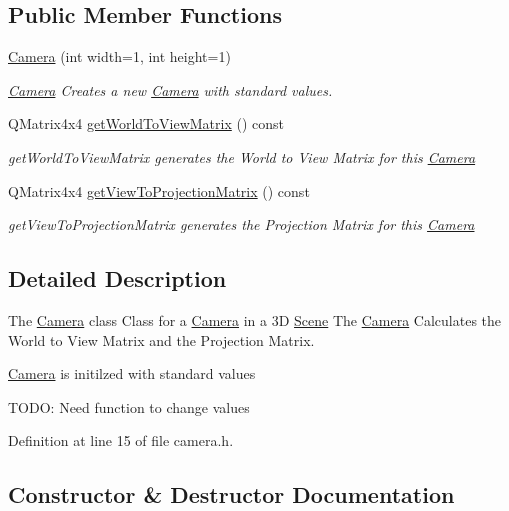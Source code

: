 \subsection*{Public Member Functions}
\begin{DoxyCompactItemize}
\item 
\hyperlink{class_camera_a3ac5bf011721a2b688e5ce077e4ee2e8}{Camera} (int width=1, int height=1)
\begin{DoxyCompactList}\small\item\em \hyperlink{class_camera}{Camera} Creates a new \hyperlink{class_camera}{Camera} with standard values. \end{DoxyCompactList}\item 
Q\+Matrix4x4 \hyperlink{class_camera_a1dd0e418636627fca41d061ef82d869d}{get\+World\+To\+View\+Matrix} () const 
\begin{DoxyCompactList}\small\item\em get\+World\+To\+View\+Matrix generates the World to View Matrix for this \hyperlink{class_camera}{Camera} \end{DoxyCompactList}\item 
Q\+Matrix4x4 \hyperlink{class_camera_aebc04996f3f393bdf98a8034d8f10a03}{get\+View\+To\+Projection\+Matrix} () const 
\begin{DoxyCompactList}\small\item\em get\+View\+To\+Projection\+Matrix generates the Projection Matrix for this \hyperlink{class_camera}{Camera} \end{DoxyCompactList}\end{DoxyCompactItemize}


\subsection{Detailed Description}
The \hyperlink{class_camera}{Camera} class Class for a \hyperlink{class_camera}{Camera} in a 3\+D \hyperlink{class_scene}{Scene} The \hyperlink{class_camera}{Camera} Calculates the World to View Matrix and the Projection Matrix. 

\hyperlink{class_camera}{Camera} is initilzed with standard values

T\+O\+D\+O\+: Need function to change values 

Definition at line 15 of file camera.\+h.



\subsection{Constructor \& Destructor Documentation}
\hypertarget{class_camera_a3ac5bf011721a2b688e5ce077e4ee2e8}{}
